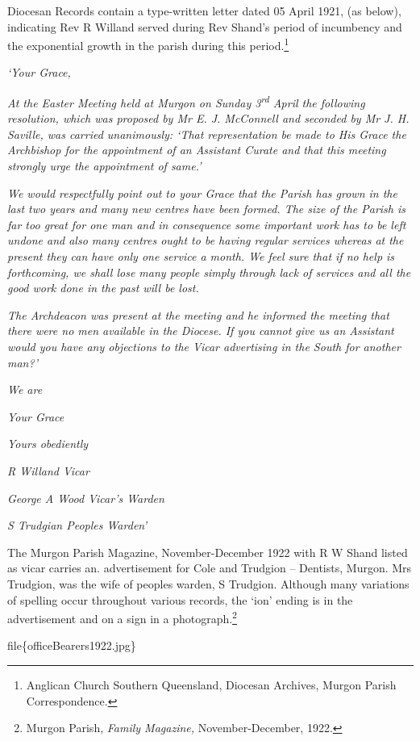 Diocesan Records contain a type-written letter dated 05 April 1921, (as
below), indicating Rev R Willand served during Rev Shand's period of
incumbency and the exponential growth in the parish during this
period.\footnote{Anglican Church Southern Queensland, Diocesan Archives,
  Murgon Parish Correspondence.}

\emph{`Your Grace,}

\emph{At the Easter Meeting held at Murgon on Sunday
3\textsuperscript{rd} April the following resolution, which was proposed
by Mr E. J. McConnell and seconded by Mr J. H. Saville, was carried
unanimously: `That representation be made to His Grace the Archbishop
for the appointment of an Assistant Curate and that this meeting
strongly urge the appointment of same.'}

\emph{We would respectfully point out to your Grace that the Parish has
grown in the last two years and many new centres have been formed. The
size of the Parish is far too great for one man and in consequence some
important work has to be left undone and also many centres ought to be
having regular services whereas at the present they can have only one
service a month. We feel sure that if no help is forthcoming, we shall
lose many people simply through lack of services and all the good work
done in the past will be lost.}

\emph{The Archdeacon was present at the meeting and he informed the
meeting that there were no men available in the Diocese. If you cannot
give us an Assistant would you have any objections to the Vicar
advertising in the South for another man?'}

\emph{We are}

\emph{Your Grace}

\emph{Yours obediently}

\emph{R Willand Vicar}

\emph{George A Wood Vicar's Warden}

\emph{S Trudgian Peoples Warden'}

The Murgon Parish Magazine, November-December 1922 with R W Shand listed
as vicar carries an. advertisement for Cole and Trudgion -- Dentists,
Murgon. Mrs Trudgion, was the wife of peoples warden, S Trudgion.
Although many variations of spelling occur throughout various records,
the `ion' ending is in the advertisement and on a sign in a
photograph.\footnote{Murgon Parish, \emph{Family Magazine,}
  November-December, 1922.}

file\{officeBearers1922.jpg\}

